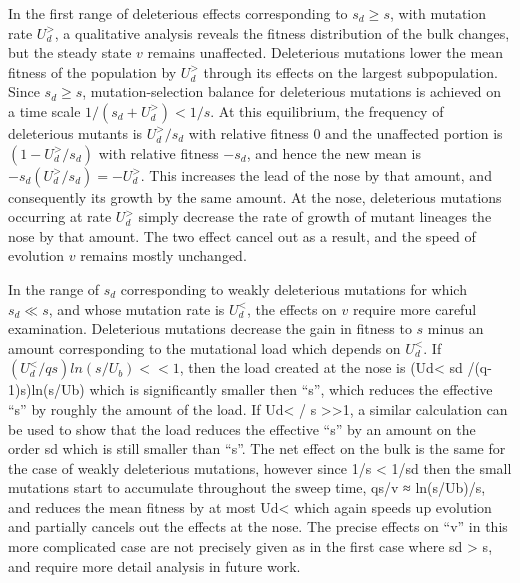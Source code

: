 \documentclass[12pt]{article}
\begin{document}
In the first range of deleterious effects corresponding to $s_d \geq s$, with mutation rate $U_d^{>}$, a qualitative analysis reveals the fitness distribution of the bulk changes, but the steady state $v$ remains unaffected.  Deleterious mutations lower the mean fitness of the population by $U_d^{>}$ through its effects on the largest subpopulation.  Since $s_d \geq s$, mutation-selection balance for deleterious mutations is achieved on a time scale $1/(s_d +U_d^{>}) < 1/s$.  At this equilibrium, the frequency of deleterious mutants is $U_d^{>}/s_d$ with relative fitness $0$ and the unaffected portion is $(1-U_d^{>}/s_d)$ with relative fitness $-s_d$, and hence the new mean is $-s_d (U_d^{>}/s_d) = -U_d^{>}$.  This increases the lead of the nose by that amount, and consequently its growth by the same amount.  At the nose, deleterious mutations occurring at rate $U_d^{>}$ simply decrease the rate of growth of mutant lineages the nose by that amount.  The two effect cancel out as a result, and the speed of evolution $v$ remains mostly unchanged.

In the range of $s_d$ corresponding to weakly deleterious mutations for which $s_d \ll s$, and whose mutation rate is $U_d^{<}$, the effects on $v$ require more careful examination.  Deleterious mutations decrease the gain in fitness to $s$ minus an amount corresponding to the mutational load which depends on $U_d^{<}$.  If $(U_d^{<} / qs)ln(s/U_b) <<1$, then the load created at the nose is (Ud< sd /(q-1)s)ln(s/Ub) which is significantly smaller then “s”, which reduces the effective “s” by roughly the amount of the load.
If  Ud< / s >>1, a similar calculation can be used to show that the load reduces the effective “s” by an amount on the order sd which is still smaller than “s”.
The net effect on the bulk is the same for the case of weakly deleterious mutations, however since 1/s < 1/sd then the small mutations start to accumulate throughout the sweep time, qs/v ≈ ln(s/Ub)/s, and reduces the mean fitness by at most Ud< which again speeds up evolution and partially cancels out the effects at the nose.
The precise effects on “v” in this more complicated case are not precisely given as in the first case where  sd > s, and require more detail analysis in future work.
\end{document}
